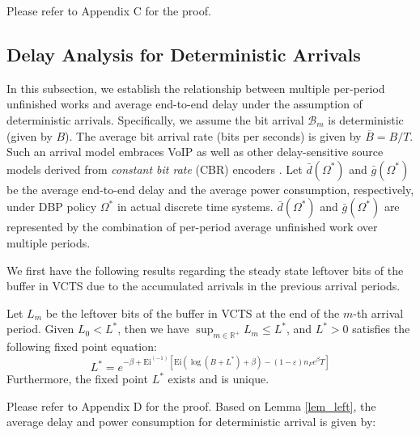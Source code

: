 \documentclass[11pt,journal, onecolumn]{./IEEEtran}
\newcommand{\red}{\color{black}}
\begin{document}
Please refer to Appendix C for the proof.


\subsection{Delay Analysis for Deterministic Arrivals}

In this subsection, we establish the relationship between multiple per-period unfinished works and average end-to-end delay under the assumption of deterministic arrivals. Specifically, we assume the bit arrival $\mathcal B_m$ is deterministic (given by $B$). The average bit arrival rate (bits per seconds) is given by $\overline{B} = B/T$. Such an arrival model embraces VoIP as well as other delay-sensitive source models derived from {\em constant bit rate} (CBR) encoders \cite{eunkyung_kim_efficient_2007, narbutt_gauging_2006}. Let $\bar d(\Omega^*)$ and $\bar g(\Omega^*)$ be the average end-to-end delay and the average power consumption, respectively, under DBP policy $\Omega^*$ in actual discrete time systems. $\bar d(\Omega^*)$ and $\bar g(\Omega^*)$ are represented by the combination of per-period average unfinished work over multiple periods. {\red We first have the following results regarding the steady state leftover bits of the buffer in VCTS due to the accumulated arrivals in the previous arrival periods.
\begin{Lemma}\label{lem_left} Let $L_m$ be the leftover bits of the buffer in VCTS at the end of the $m$-th arrival period. Given $L_{0}<L^*$, then we have $\sup_{m\in\mathbb{R}^+} L_m \leq L^*$, and $L^*>0$ satisfies the following fixed point equation:
\begin{equation}\label{eq_L}
{L^*}= {e^{ - \beta  + \text{Ei}^{( - 1)}\left[ {\text{Ei}\left( {\log (B + {L^*}) + \beta  } \right) -  (1 - {\varepsilon}){n_F}{e^{\beta  }}T} \right]}}
\end{equation}
Furthermore, the fixed point $L^*$ exists and is unique. ~\hfill\IEEEQED
\end{Lemma}
}

Please refer to Appendix D for the proof. Based on Lemma \ref{lem_left}, the average delay and power consumption for deterministic arrival is given by:
\end{document}
